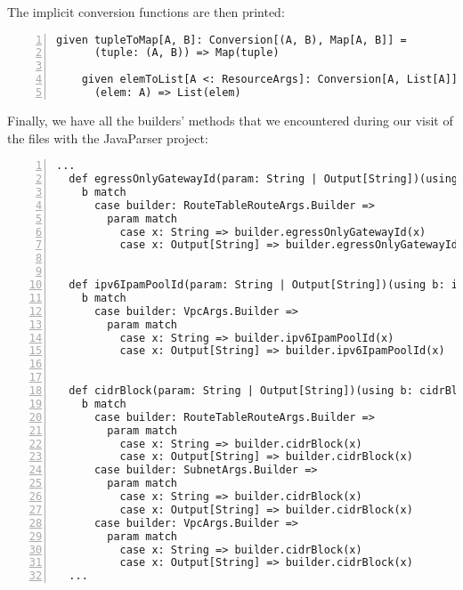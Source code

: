 The implicit conversion functions are then printed:\\
\begin{minipage}{\linewidth}
  \begin{lstlisting}[numbers=left, numberstyle=\tiny, numbersep=-5pt, stepnumber=1]
    given tupleToMap[A, B]: Conversion[(A, B), Map[A, B]] =
      (tuple: (A, B)) => Map(tuple)
  
    given elemToList[A <: ResourceArgs]: Conversion[A, List[A]] =
      (elem: A) => List(elem)
  \end{lstlisting}
 \end{minipage}
Finally, we have all the builders' methods that we encountered during our visit of the files with the JavaParser project:\\
  \begin{lstlisting}[numbers=left, numberstyle=\tiny, numbersep=-5pt, stepnumber=1]
  ...
  def egressOnlyGatewayId(param: String | Output[String])(using b: egressOnlyGatewayIdOwners): Unit =
    b match
      case builder: RouteTableRouteArgs.Builder =>
        param match
          case x: String => builder.egressOnlyGatewayId(x)
          case x: Output[String] => builder.egressOnlyGatewayId(x)
  
  
  def ipv6IpamPoolId(param: String | Output[String])(using b: ipv6IpamPoolIdOwners): Unit =
    b match
      case builder: VpcArgs.Builder =>
        param match
          case x: String => builder.ipv6IpamPoolId(x)
          case x: Output[String] => builder.ipv6IpamPoolId(x)
  
  
  def cidrBlock(param: String | Output[String])(using b: cidrBlockOwners): Unit =
    b match
      case builder: RouteTableRouteArgs.Builder =>
        param match
          case x: String => builder.cidrBlock(x)
          case x: Output[String] => builder.cidrBlock(x)
      case builder: SubnetArgs.Builder =>
        param match
          case x: String => builder.cidrBlock(x)
          case x: Output[String] => builder.cidrBlock(x)
      case builder: VpcArgs.Builder =>
        param match
          case x: String => builder.cidrBlock(x)
          case x: Output[String] => builder.cidrBlock(x)
  ...
  \end{lstlisting}

